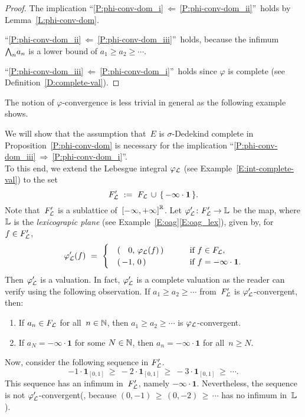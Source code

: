 \documentclass[main.tex]{subfiles}
\begin{document}
\begin{proof}
The implication 
``\ref{P:phi-conv-dom_i}$\ \Longleftarrow\ $\ref{P:phi-conv-dom_ii}''\ 
holds by Lemma~\ref{L:phi-conv-dom}.

\noindent
``\ref{P:phi-conv-dom_ii}$\ \Longleftarrow\ $\ref{P:phi-conv-dom_iii}''\ 
holds, because the infimum~$\textstyle{\bigwedge}_n a_n$ is a 
lower bound of $a_1 \geq a_2 \geq \dotsb$.

\noindent
``\ref{P:phi-conv-dom_iii}$\ \Longleftarrow\ $\ref{P:phi-conv-dom_i}''\ 
holds since $\varphi$ is complete
(see Definition~\ref{D:complete-val}).
\end{proof}
%
%
\noindent
The notion of $\varphi$-convergence
is less trivial in general
as the following example shows.
\begin{ex}
We will show that
the assumption 
that~$E$ is $\sigma$-Dedekind complete
in Proposition~\ref{P:phi-conv-dom}
is necessary for 
the implication 
``\ref{P:phi-conv-dom_iii}$\ \Longrightarrow\ $\ref{P:phi-conv-dom_i}''.\\
To this end, we extend the Lebesgue integral $\varphi_{\mathcal{L}}$
(see Example~\ref{E:int-complete-val})
to the set 
\begin{equation*}
F_{\mathcal{L}}'\ :=\  F_{\mathcal{L}}\,\cup\,\{\,-\infty\cdot \mathbf{1}\,\}.
\end{equation*}
Note that~$F_{\mathcal{L}}'$ is a sublattice of~${[-\infty,+\infty]}^{\mathbb{R}}$.
Let $\varphi_{\mathcal{L}}'\colon F_{\mathcal{L}}'\rightarrow \mathbb{L}$
be the map,
where $\mathbb{L}$ is the \emph{lexicograpic plane} 
(see Example~\ref{E:oag}\ref{E:oag_lex}),
given by, for $f\in F_{\mathcal{L}}'$,
\begin{equation*}
\Lphi'( f) \ =\ 
\begin{cases}
\quad (\,\rsub{0}{-1},\,\Lphi(f)\,)\,  \qquad
&\text{if $f\in\LF$}, \\
\quad (\,-1,\,0\,)  &\text{if $f=-\infty\cdot \mathbf{1}$}.
\end{cases}
\end{equation*}
Then $\varphi_{\mathcal{L}}'$ is a valuation.
In fact, 
$\varphi_{\mathcal{L}}'$ is a complete valuation
as the reader can verify 
using the following observation.
If $a_1 \geq a_2 \geq \dotsb$ from~$F_{\mathcal{L}}'$
is $\varphi_{\mathcal{L}}'$-convergent, then:
\begin{enumerate}
\item
If $a_n \in F_{\mathcal{L}}$ for all~$n\in\mathbb{N}$,
then $a_1 \geq a_2 \geq \dotsb$ is $\varphi_{\mathcal{L}}$-convergent.
\item
If $a_N = -\infty\cdot \mathbf{1}$
for some $N\in\mathbb{N}$,
then $a_n = -\infty\cdot \mathbf{1}$ for all~$n\geq N$.
\end{enumerate}
Now, 
consider the following sequence in $F_{\mathcal{L}}'$.
\begin{equation*}
-1\cdot\mathbf{1}_{[0,1]} \ \geq\ 
-2 \cdot\mathbf{1}_{[0,1]} \ \geq \ 
-3 \cdot\mathbf{1}_{[0,1]}
\ \geq\ \dotsb.
\end{equation*}
This sequence has an infimum in~$F_{\mathcal{L}}'$, 
namely $-\infty\cdot \mathbf{1}$.
Nevertheless,
the sequence is not $\varphi_{\mathcal{L}}'$-convergent(,
because $(0,-1) \,\geq\, (0,-2)\,\geq\, \dotsb$
has no infimum in~$\mathbb{L}$).
\end{ex}
\end{document}

